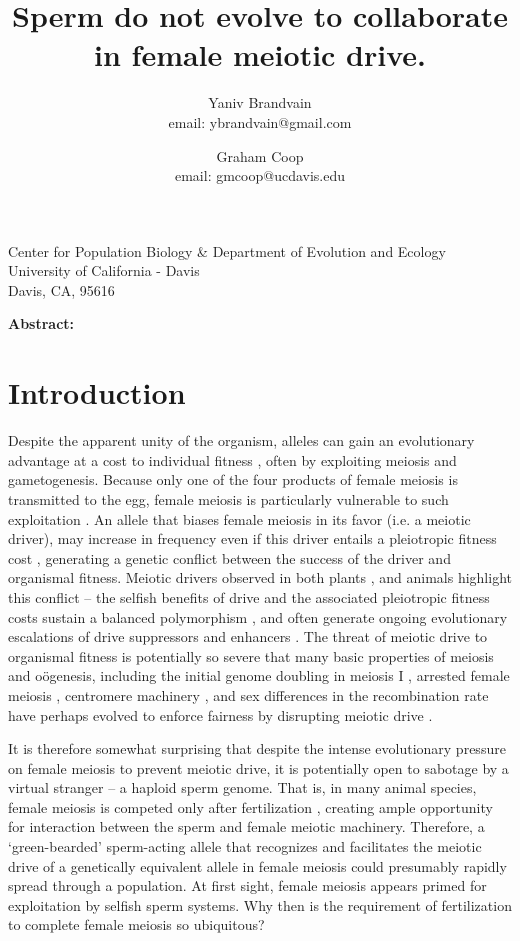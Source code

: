 \documentclass[12pt,letterpaper]{article}
\title{
Sperm do not evolve to collaborate in female meiotic drive. 
}
\author{Yaniv Brandvain \\ email: ybrandvain@gmail.com  \and Graham Coop \\ email: gmcoop@ucdavis.edu }
\date{}
\begin{document}
\maketitle
\begin{center}
Center for Population Biology \& Department of Evolution and Ecology \\ University of California - Davis \\ Davis, CA, 95616
\end{center}

{\bf Abstract:}
\newpage

\section*{Introduction}
Despite the apparent unity of the organism, alleles can
gain an evolutionary advantage at a cost to  individual fitness
\citep{Burt2006}, often by exploiting meiosis and gametogenesis.
Because only one of the four products of female meiosis is transmitted to the egg, female meiosis is particularly vulnerable to such exploitation \citep{Sandler1957,Pardo-ManuelDeVillena2001a}. 
An allele that biases female meiosis in its favor (i.e. a meiotic driver), may increase in frequency even if this driver entails a pleiotropic fitness cost \citep{Prout1973}, generating a genetic conflict between the success of the driver and organismal fitness.
Meiotic drivers observed in both plants
\citep{Buckler1999,Fishman2005,Fishman2008}, and animals
\citep{Agulnik1990,Wu2005,Pardo-ManuelDeVillena2001c} highlight this
conflict -- the selfish benefits of drive and the associated
pleiotropic fitness costs sustain a balanced polymorphism
\citep{Prout1973}, 
and often generate ongoing evolutionary escalations of drive suppressors and enhancers \citep{Dawe1996,Fishman2008}. 
The threat of meiotic drive to organismal fitness is potentially so
severe that many basic properties of
meiosis and o\"{o}genesis, including the initial genome doubling in
meiosis I \citep{Haig1991}, arrested female meiosis
\citep{Mira1998}, centromere machinery \citep{Malik2002a,Malik2009,Malik2009}, and sex differences in the recombination rate \citep{Haig2010,Brandvain2012} 
have perhaps evolved to enforce fairness by disrupting meiotic drive \citep{Rice2013}.

It is therefore somewhat surprising that despite the intense evolutionary pressure on female meiosis to prevent meiotic drive, 
it is potentially open to sabotage by a virtual stranger -- a haploid sperm genome.
That is, in many animal species, female meiosis is competed only after fertilization \citep{Masui_book}, 
creating ample opportunity for interaction between the sperm and female meiotic machinery. 
Therefore, a `green-bearded' \citep{Gardner2010} sperm-acting allele that recognizes and facilitates the meiotic drive of a genetically equivalent allele in female meiosis %
     could presumably rapidly spread through a population. 
At first sight, female meiosis appears primed for exploitation by selfish sperm systems.  
Why then is the requirement of fertilization to complete female meiosis so ubiquitous? 
\end{document}
